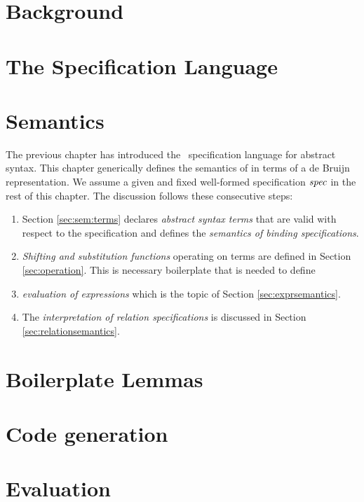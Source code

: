 
\chapter{Background}\label{ch:gen:background}



\chapter{The \Knot Specification Language}\label{ch:knotsyntax}


\chapter{Semantics}\label{ch:knotsemantics}

The previous chapter has introduced the \Knot~specification language for
abstract syntax. This chapter generically defines the semantics of \Knot in
terms of a de Bruijn representation. We assume a given and fixed well-formed
specification $\mathit{spec}$ in the rest of this chapter. The discussion follows these
consecutive steps:

\begin{enumerate}
\item Section \ref{sec:sem:terms} declares \emph{abstract syntax terms} that are
  valid with respect to the specification and defines the \emph{semantics of
    binding specifications}.
\item \emph{Shifting and substitution functions} operating on terms are defined
  in Section \ref{sec:operation}. This is necessary boilerplate that is needed
  to define
\item \emph{evaluation of expressions} which is the topic of Section
  \ref{sec:exprsemantics}.
\item The \emph{interpretation of relation specifications} is discussed in
  Section \ref{sec:relationsemantics}.
\end{enumerate}





\chapter{Boilerplate Lemmas}\label{ch:elaboration}




\chapter{Code generation}\label{ch:codegen}


\chapter{Evaluation}





